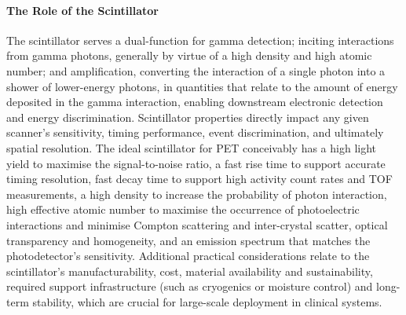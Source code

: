 \paragraph{The Role of the Scintillator}
The scintillator serves a dual-function for gamma detection; inciting interactions from gamma photons, generally by virtue of a high density and high atomic number; and amplification, converting the interaction of a single photon into a shower of lower-energy photons, in quantities that relate to the amount of energy deposited in the gamma interaction, enabling downstream electronic detection and energy discrimination.
Scintillator properties directly impact any given scanner's sensitivity, timing performance, event discrimination, and ultimately spatial resolution.
The ideal scintillator for PET conceivably has a high light yield to maximise the signal-to-noise ratio, a fast rise time to support accurate timing resolution, fast decay time to support high activity count rates and TOF measurements, a high density to increase the probability of photon interaction, high effective atomic number to maximise the occurrence of photoelectric interactions and minimise Compton scattering and inter-crystal scatter, optical transparency and homogeneity, and an emission spectrum that matches the photodetector's sensitivity.
Additional practical considerations relate to the scintillator's manufacturability, cost, material availability and sustainability, required support infrastructure (such as cryogenics or moisture control) and long-term stability, which are crucial for large-scale deployment in clinical systems.

